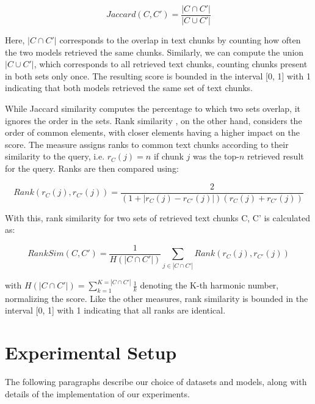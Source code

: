 \documentclass[nonacm,sigconf]{acmart}
\begin{document}
\begin{equation}
    Jaccard(C, C') = \frac{|C \cap C'|}{|C \cup C'|}
\end{equation}

Here, $|C \cap C'|$ corresponds to the overlap in text chunks by counting how often the two models retrieved the same chunks. Similarly, we can compute the union $|C \cup C'|$, which corresponds to all retrieved text chunks, counting chunks present in both sets only once. The resulting score is bounded in the interval [0, 1] with 1 indicating that both models retrieved the same set of text chunks.

While Jaccard similarity computes the percentage to which two sets overlap, it ignores the order in the sets. Rank similarity \cite{rank}, on the other hand, considers the order of common elements, with closer elements having a higher impact on the score. The measure assigns ranks to common text chunks according to their similarity to the query, i.e. $r_C(j) = n$ if chunk $j$ was the top-$n$ retrieved result for the query. Ranks are then compared using:

\begin{equation}
    Rank(r_C(j), r_{C'}(j)) = \frac{2}{(1 + |r_C(j) - r_{C'}(j)|)(r_C(j) + r_{C'}(j))}
\end{equation}

With this, rank similarity for two sets of retrieved text chunks C, C' is calculated as:

\begin{equation}
    RankSim(C, C') = \frac{1}{H(|C \cap C'|)}\sum_{j \in |C \cap C'|}Rank(r_C(j), r_{C'}(j))
\end{equation}

with $H(|C \cap C'|) = \sum_{k=1}^{K=|C \cap C'|}\frac{1}{k}$ denoting the K-th harmonic number, normalizing the score. Like the other measures, rank similarity is bounded in the interval [0, 1] with 1 indicating that all ranks are identical.

\section{Experimental Setup}

The following paragraphs describe our choice of datasets and models, along with details of the implementation of our experiments.
\end{document}
